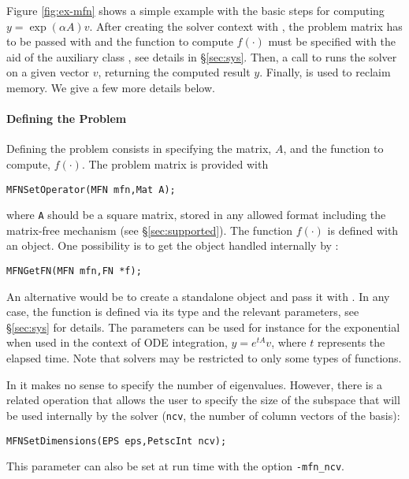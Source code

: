 Figure \ref{fig:ex-mfn} shows a simple example with the basic steps for computing $y=\exp(\alpha A)v$. After creating the solver context with , the problem matrix has to be passed with  and the function to compute $f(\cdot)$ must be specified with the aid of the auxiliary class , see details in \S\ref{sec:sys}. Then, a call to  runs the solver on a given vector $v$, returning the computed result $y$. Finally,  is used to reclaim memory. We give a few more details below.

\paragraph{Defining the Problem}

Defining the problem consists in specifying the matrix, $A$, and the function to compute, $f(\cdot)$. The problem matrix is provided with
	\begin{Verbatim}[fontsize=\small]
	MFNSetOperator(MFN mfn,Mat A);
	\end{Verbatim}
where \texttt{A} should be a square matrix, stored in any allowed \petsc format including the matrix-free mechanism (see \S\ref{sec:supported}). The function $f(\cdot)$ is defined with an  object. One possibility is to get the  object handled internally by :
	\begin{Verbatim}[fontsize=\small]
	MFNGetFN(MFN mfn,FN *f);
	\end{Verbatim}
An alternative would be to create a standalone  object and pass it with . In any case, the function is defined via its type and the relevant parameters, see \S\ref{sec:sys} for details. The parameters can be used for instance for the exponential when used in the context of ODE integration, $y=e^{tA}v$, where $t$ represents the elapsed time. Note that  solvers may be restricted to only some types of  functions.

In  it makes no sense to specify the number of eigenvalues. However, there is a related operation that allows the user to specify the size of the subspace that will be used internally by the solver (\texttt{ncv}, the number of column vectors of the basis):
	\begin{Verbatim}[fontsize=\small]
	MFNSetDimensions(EPS eps,PetscInt ncv);
	\end{Verbatim}
This parameter can also be set at run time with the option \Verb!-mfn_ncv!.

